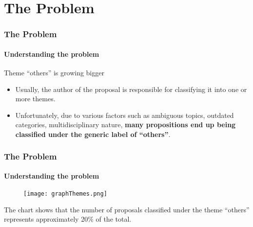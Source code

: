 \section{The Problem}
\begin{frame}
	\frametitle{The Problem}
	\framesubtitle{Understanding the problem}
	
	
	\begin{alertblock}{Theme ``others'' is growing bigger}
		\begin{itemize}
			\item 	Usually, the author of the proposal is responsible for classifying it into one or more themes.
			
			
			\item Unfortunately, due to various factors such as ambiguous topics, outdated categories, multidisciplinary nature, \textbf{many propositions end up being classified under the generic label of ``others''}.
			
			
		\end{itemize}
	\end{alertblock}	
\end{frame}
\begin{frame}
	\frametitle{The Problem}
	\framesubtitle{Understanding the problem}	
	\begin{figure}
		\texttt{[image: graphThemes.png]}
	\end{figure}


	\begin{block}{}
		\scriptsize
		The chart shows that the number of proposals classified under the theme “others” represents approximately 20\% of the total. 
	\end{block}	


\end{frame}
